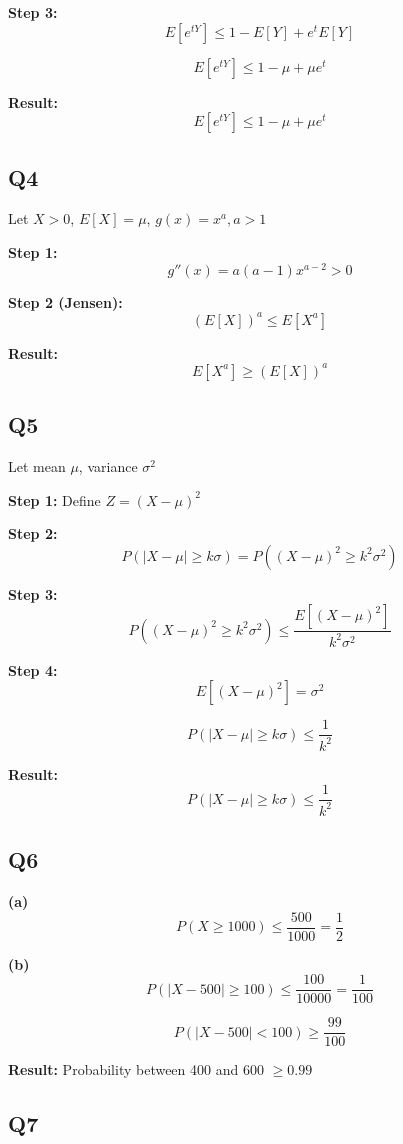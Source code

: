 \documentclass[11pt]{article}
\begin{document}
\textbf{Step 3:}
\[
E[e^{tY}] \le 1 - E[Y] + e^t E[Y]
\]

\[
E[e^{tY}] \le 1 - \mu + \mu e^t
\]

\textbf{Result:}
\[
E[e^{tY}] \le 1 - \mu + \mu e^t
\]

\subsection*{Q4}

Let $X > 0$, $E[X] = \mu$, $g(x) = x^a, a > 1$

\textbf{Step 1:}
\[
g''(x) = a(a-1)x^{a-2} > 0
\]

\textbf{Step 2 (Jensen):}
\[
(E[X])^a \le E[X^a]
\]

\textbf{Result:}
\[
E[X^a] \ge (E[X])^a
\]

\subsection*{Q5}

Let mean $\mu$, variance $\sigma^2$

\textbf{Step 1:} Define $Z = (X-\mu)^2$

\textbf{Step 2:}
\[
P(|X-\mu| \ge k\sigma) = P((X-\mu)^2 \ge k^2\sigma^2)
\]

\textbf{Step 3:}
\[
P((X-\mu)^2 \ge k^2\sigma^2) \le \frac{E[(X-\mu)^2]}{k^2\sigma^2}
\]

\textbf{Step 4:}
\[
E[(X-\mu)^2] = \sigma^2
\]

\[
P(|X-\mu| \ge k\sigma) \le \frac{1}{k^2}
\]

\textbf{Result:}
\[
P(|X-\mu| \ge k\sigma) \le \frac{1}{k^2}
\]

\subsection*{Q6}

\textbf{(a)}
\[
P(X \ge 1000) \le \frac{500}{1000} = \frac{1}{2}
\]

\textbf{(b)}
\[
P(|X - 500| \ge 100) \le \frac{100}{10000} = \frac{1}{100}
\]

\[
P(|X - 500| < 100) \ge \frac{99}{100}
\]

\textbf{Result:} Probability between 400 and 600 $\ge 0.99$

\subsection*{Q7}
\end{document}
